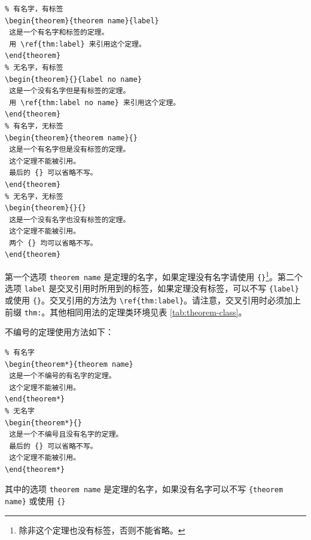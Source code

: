 \documentclass[lang=cn,newtx,10pt,scheme=chinese,pad,twocol]{zznote}
\begin{document}
\begin{lstlisting}
% 有名字，有标签
\begin{theorem}{theorem name}{label}
 这是一个有名字和标签的定理。
 用 \ref{thm:label} 来引用这个定理。
\end{theorem}
% 无名字，有标签
\begin{theorem}{}{label no name}
 这是一个没有名字但是有标签的定理。
 用 \ref{thm:label no name} 来引用这个定理。
\end{theorem}
% 有名字，无标签
\begin{theorem}{theorem name}{}
 这是一个有名字但是没有标签的定理。
 这个定理不能被引用。
 最后的 {} 可以省略不写。
\end{theorem}
% 无名字，无标签
\begin{theorem}{}{}
 这是一个没有名字也没有标签的定理。
 这个定理不能被引用。
 两个 {} 均可以省略不写。
\end{theorem}
\end{lstlisting}

第一个选项 \lstinline{theorem name} 是定理的名字，如果定理没有名字请使用 \lstinline|{}|\cprotect\footnote{除非这个定理也没有标签，否则不能省略。}。第二个选项 \lstinline{label} 是交叉引用时所用到的标签，如果定理没有标签，可以不写 \lstinline|{label}| 或使用 \lstinline|{}|。交叉引用的方法为 \lstinline|\ref{thm:label}|。请注意，交叉引用时必须加上前缀 \lstinline{thm:}。其他相同用法的定理类环境见表 \ref{tab:theorem-class}。

不编号的定理使用方法如下：

\begin{lstlisting}
% 有名字
\begin{theorem*}{theorem name}
 这是一个不编号的有名字的定理。
 这个定理不能被引用。
\end{theorem*}
% 无名字
\begin{theorem*}{}
 这是一个不编号且没有名字的定理。
 最后的 {} 可以省略不写。
 这个定理不能被引用。
\end{theorem*}
\end{lstlisting}
其中的选项 \lstinline{theorem name} 是定理的名字，如果没有名字可以不写 \lstinline|{theorem name}| 或使用 \lstinline|{}|
\end{document}

